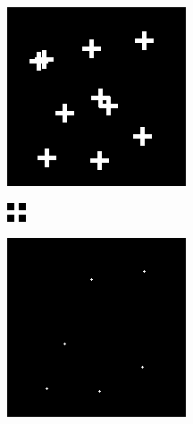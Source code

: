 \documentclass[a4paper,12pt,notitlepage]{article}
\begin{document}
			\begin{figure}[H]
				\centering
				\begin{subfigure}[b]{0.3\textwidth}
					\centering
					\includegraphics[width=\textwidth]{chris/image12}
					\caption{}
				\end{subfigure}
				\begin{subfigure}[b]{0.3\textwidth}
					\centering
					\includegraphics[]{chris/image13}
					\caption{}
				\end{subfigure}
				\begin{subfigure}[b]{0.3\textwidth}
					\centering
					\includegraphics[width=\textwidth]{chris/image14}

\end{subfigure}
\end{figure}
\end{document}
